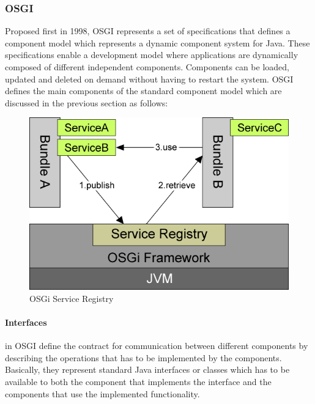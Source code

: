 \subsubsection{OSGI}

Proposed first in 1998, OSGI represents a set of specifications that defines a component model which represents a dynamic component system for Java. These specifications enable a development model where applications are dynamically composed of different independent components. Components can be loaded, updated and deleted on demand without having to restart the system. OSGI defines the main components of the standard component model which are discussed in the previous section as follows:

\begin{figure}[h!]
  \centering
  	\includegraphics[scale=0.6]{plug-in/OSGI.png}
  \caption{OSGi Service Registry \cite{tavares2008gentle}}
  \label{fig_osgi}
\end{figure}

\paragraph{Interfaces}
 in OSGI define the contract for communication between different components by describing the operations that has to be implemented by the components. Basically, they represent standard Java interfaces or classes which has to be available to both the component that implements the interface and the components that use the implemented functionality.


